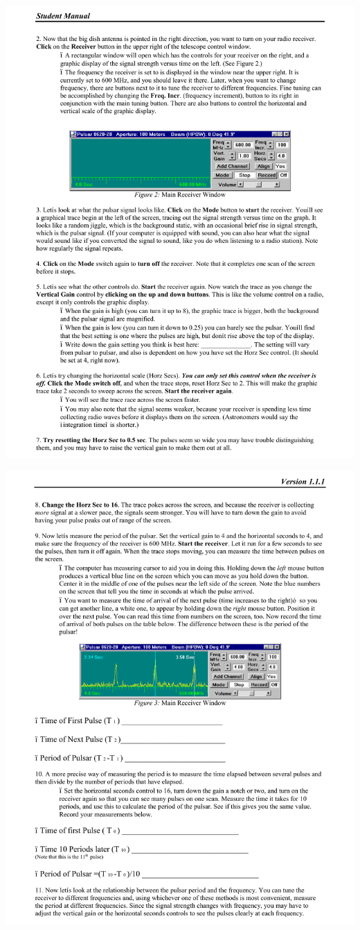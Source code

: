 \includegraphics[width=\textwidth]{pulsars/pulsar4.pdf}
\vfil\eject

\includegraphics[width=\textwidth]{pulsars/pulsar5.pdf}
\vfil\eject

